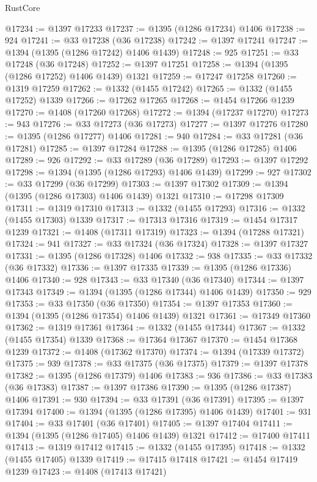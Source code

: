 \begin{lexlean}{RustCore}
\begin{coremodule}
@17234 := @1397 @17233
@17237 := @1395 (@1286 @17234) @1406
@17238 := 924
@17241 := @33 @17238 (@36 @17238)
@17242 := @1397 @17241
@17247 := @1394 (@1395 (@1286 @17242) @1406 @1439)
@17248 := 925
@17251 := @33 @17248 (@36 @17248)
@17252 := @1397 @17251
@17258 := @1394 (@1395 (@1286 @17252) @1406 @1439) @1321
@17259 := @17247 @17258
@17260 := @1319 @17259
@17262 := @1332 (@1455 @17242)
@17265 := @1332 (@1455 @17252) @1339
@17266 := @17262 @17265
@17268 := @1454 @17266 @1239
@17270 := @1408 (@17260 @17268)
@17272 := @1394 (@17237 @17270)
@17273 := 943
@17276 := @33 @17273 (@36 @17273)
@17277 := @1397 @17276
@17280 := @1395 (@1286 @17277) @1406
@17281 := 940
@17284 := @33 @17281 (@36 @17281)
@17285 := @1397 @17284
@17288 := @1395 (@1286 @17285) @1406
@17289 := 926
@17292 := @33 @17289 (@36 @17289)
@17293 := @1397 @17292
@17298 := @1394 (@1395 (@1286 @17293) @1406 @1439)
@17299 := 927
@17302 := @33 @17299 (@36 @17299)
@17303 := @1397 @17302
@17309 := @1394 (@1395 (@1286 @17303) @1406 @1439) @1321
@17310 := @17298 @17309
@17311 := @1319 @17310
@17313 := @1332 (@1455 @17293)
@17316 := @1332 (@1455 @17303) @1339
@17317 := @17313 @17316
@17319 := @1454 @17317 @1239
@17321 := @1408 (@17311 @17319)
@17323 := @1394 (@17288 @17321)
@17324 := 941
@17327 := @33 @17324 (@36 @17324)
@17328 := @1397 @17327
@17331 := @1395 (@1286 @17328) @1406
@17332 := 938
@17335 := @33 @17332 (@36 @17332)
@17336 := @1397 @17335
@17339 := @1395 (@1286 @17336) @1406
@17340 := 928
@17343 := @33 @17340 (@36 @17340)
@17344 := @1397 @17343
@17349 := @1394 (@1395 (@1286 @17344) @1406 @1439)
@17350 := 929
@17353 := @33 @17350 (@36 @17350)
@17354 := @1397 @17353
@17360 := @1394 (@1395 (@1286 @17354) @1406 @1439) @1321
@17361 := @17349 @17360
@17362 := @1319 @17361
@17364 := @1332 (@1455 @17344)
@17367 := @1332 (@1455 @17354) @1339
@17368 := @17364 @17367
@17370 := @1454 @17368 @1239
@17372 := @1408 (@17362 @17370)
@17374 := @1394 (@17339 @17372)
@17375 := 939
@17378 := @33 @17375 (@36 @17375)
@17379 := @1397 @17378
@17382 := @1395 (@1286 @17379) @1406
@17383 := 936
@17386 := @33 @17383 (@36 @17383)
@17387 := @1397 @17386
@17390 := @1395 (@1286 @17387) @1406
@17391 := 930
@17394 := @33 @17391 (@36 @17391)
@17395 := @1397 @17394
@17400 := @1394 (@1395 (@1286 @17395) @1406 @1439)
@17401 := 931
@17404 := @33 @17401 (@36 @17401)
@17405 := @1397 @17404
@17411 := @1394 (@1395 (@1286 @17405) @1406 @1439) @1321
@17412 := @17400 @17411
@17413 := @1319 @17412
@17415 := @1332 (@1455 @17395)
@17418 := @1332 (@1455 @17405) @1339
@17419 := @17415 @17418
@17421 := @1454 @17419 @1239
@17423 := @1408 (@17413 @17421)

\end{coremodule}
\end{lexlean}
